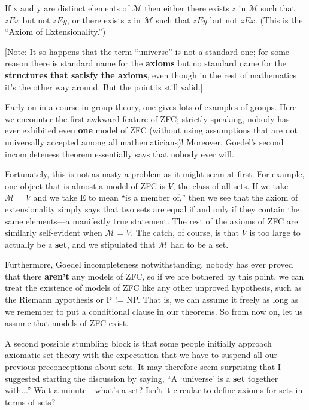 \documentclass[10pt]{article}
\begin{document}
 If x and y are distinct elements of $\mathcal{M}$ then either there
 exists $z$ in $\mathcal{M}$ such that $z E x$ but not $z E y$, or there
 exists $z$ in $\mathcal{M}$ such that $z E y$ but not $z E x$. (This is
 the ``Axiom of Extensionality.'')

[Note: It so happens that the term ``universe'' is not a standard one; for some reason there is standard name for the \textbf{axioms} but no standard name for the \textbf{structures that satisfy the axioms}, even though in the rest of mathematics it's the other way around. But the point is still valid.]

Early on in a course in group theory, one gives lots of examples of groups. Here we encounter the first awkward feature of ZFC; strictly speaking, nobody has ever exhibited even \textbf{one} model of ZFC (without using assumptions that are not universally accepted among all mathematicians)! Moreover, Goedel's second incompleteness theorem essentially says that nobody ever will.

Fortunately, this is not as nasty a problem as it might seem at first. For example, one object that is almost a model of ZFC is $V$, the class of all sets. If we take $\mathcal{M} = V$ and we take E to mean ``is a member of,'' then we see that the axiom of extensionality simply says that two sets are equal if and only if they contain the same elements---a manifestly true statement. The rest of the axioms of ZFC are similarly self-evident when $\mathcal{M} = V$. The catch, of course, is that $V$ is too large to actually be a \textbf{set}, and we stipulated that $\mathcal{M}$ had to be a set.

Furthermore, Goedel incompleteness notwithstanding, nobody has ever proved that there \textbf{aren't} any models of ZFC, so if we are bothered by this point, we can treat the existence of models of ZFC like any other unproved hypothesis, such as the Riemann hypothesis or P != NP. That is, we can assume it freely as long as we remember to put a conditional clause in our theorems. So from now on, let us assume that models of ZFC exist.

A second possible stumbling block is that some people initially approach axiomatic set theory with the expectation that we have to suspend all our previous preconceptions about sets. It may therefore seem surprising that I suggested starting the discussion by saying, ``A `universe' is a \textbf{set} together with...'' Wait a minute---what's a set? Isn't it circular to define axioms for sets in terms of sets?
\end{document}

